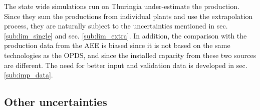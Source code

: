 The state wide simulations run on Thuringia under-estimate the production. Since they sum the productions from individual plants and use the extrapolation process, they are naturally subject to the uncertainties mentioned in sec. \ref{sub:lim_single} and sec. \ref{sub:lim_extra}. In addition, the comparison with the production data from the AEE is biased since it is not based on the same technologies as the OPDS, and since the installed capacity from these two sources are different. The need for better input and validation data is developed in sec. \ref{sub:imp_data}.

\subsection{Other uncertainties}
\label{sub:limits_others}


